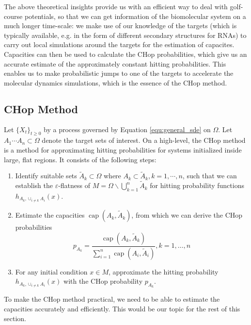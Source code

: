 \documentclass[english, aip, jcp, priprint, graphicx,floatfix]{revtex4-1}
\theoremstyle{plain}
\theoremstyle{definition}
\theoremstyle{plain}
\begin{document}
The above theoretical insights provide us with an efficient way to deal with golf-course potentials, so that we can get information of the biomolecular system on a much longer time-scale: we make use of our knowledge of the targets (which is typically available, e.g. in the form of different secondary structures for RNAs) to carry out local simulations around the targets for the estimation of capacites. Capacities can then be used to calculate the CHop probabilities, which give us an accurate estimate of the approximately constant hitting probabilities. This enables us to make probabilistic jumps to one of the targets to accelerate the molecular dynamics simulations, which is the essence of the CHop method.

\subsection{CHop Method}

Let $\{X_t\}_{t \geq 0}$ by a process governed by Equation \ref{equ:general_sde} on $\Omega$.  Let $A_1\cdots A_n \subset \Omega$ denote the target sets of interest.  On a high-level, the CHop method is a method for approximating hitting probabilities for systems initialized inside large, flat regions.  It consists of the following steps:

\begin{enumerate}
	\item Identify suitable sets $\tilde A_k \subset \Omega$ where $A_k \subset \tilde{A}_k, k=1, \cdots, n$, such that we can establish the $\varepsilon$-flatness of $M = \Omega \backslash \bigcup_{k = 1}^n \tilde{A}_k $ for hitting probability functions $h_{A_k,\cup_{i\neq k} A_i}(x)$.
	\item Estimate the capacities $\ensuremath{\operatorname{cap}} (A_k, \tilde{A}_k)$, from which we can derive the CHop probabilities
\begin{equation*}
p_{A_k} = \frac{\ensuremath{\operatorname{cap}} (A_k, \tilde{A}_k)}{\sum_{i = 1}^n \ensuremath{\operatorname{cap}} (A_i, \tilde{A}_i)}, k=1,\dots, n
\end{equation*} 
	\item For any initial condition $x \in M$, approximate the hitting probability $h_{A_k,\cup_{i\neq k} A_i}(x)$ with the CHop probability $p_{A_k}$.  
\end{enumerate}

To make the CHop method practical, we need to be able to estimate the capacities accurately and efficiently. This would be our topic for the rest of this section.
\end{document}

